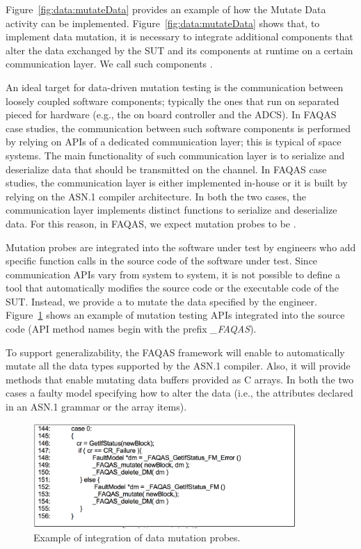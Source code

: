 Figure~\ref{fig:data:mutateData} provides an example of how the Mutate Data activity can be implemented. Figure~\ref{fig:data:mutateData} shows that, to implement data mutation, it is necessary to integrate additional components that alter the data exchanged by the SUT and its components at runtime on a certain communication layer. We call such components .

An ideal target for data-driven mutation testing is the communication between loosely coupled software components; typically the ones that run on separated pieced for hardware (e.g., the on board controller and the ADCS).
In FAQAS case studies, the communication between such software components is performed by relying on APIs of a dedicated communication layer; this is typical of space systems. The main functionality of such communication layer is to serialize and deserialize data that should be transmitted on the channel. In FAQAS case studies, the communication layer is either implemented in-house or it is built by relying on the ASN.1 compiler architecture. In both the two cases, the communication layer implements distinct functions to serialize and deserialize data.
For this reason, in FAQAS, we expect mutation probes to be .

Mutation probes are integrated into the software under test by engineers who  add specific function calls in the source code of the software under test. Since communication APIs vary from system to system, it is not possible to define a tool that automatically modifies the source code or the executable code of the SUT.  Instead, we provide a  to mutate the data specified by the engineer.
Figure~\ref{fig:data:mutationProbes} shows an example of mutation testing APIs integrated into the source code (API method names begin with the prefix \emph{\_FAQAS}).

To support generalizability, the FAQAS framework will enable to automatically mutate all the data types supported by the ASN.1 compiler. Also, it will provide methods that enable mutating data buffers provided as C arrays. In both the two cases a faulty model specifying how to alter the data (i.e., the attributes declared in an ASN.1 grammar or the array items).


\begin{figure}
	\centering
		\includegraphics[width=10cm]{images/dataMutationProbes}
		\caption{Example of integration of data mutation probes.}
		\label{fig:data:mutationProbes}
	\end{figure}

